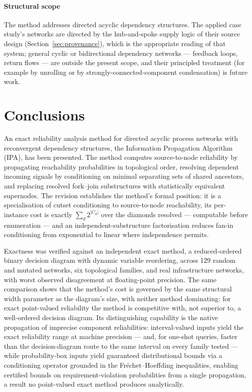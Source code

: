 \documentclass[preprint,12pt]{elsarticle}
\theoremstyle{definition}
\begin{document}
\paragraph{Structural scope} The method addresses directed acyclic dependency structures. The applied
case study's networks are directed by the hub-and-spoke supply logic of their source design
(Section~\ref{sec:provenance}), which is the appropriate reading of that system; general cyclic or
bidirectional dependency networks --- feedback loops, return flows --- are outside the present scope,
and their principled treatment (for example by unrolling or by strongly-connected-component
condensation) is future work.

\section{Conclusions}\label{sec:conclusions}

An exact reliability analysis method for directed acyclic process networks with reconvergent dependency
structures, the Information Propagation Algorithm (IPA), has been presented. The method computes
source-to-node reliability by propagating reachability probabilities in topological order, resolving
dependent incoming signals by conditioning on minimal separating sets of shared ancestors, and replacing
resolved fork--join substructures with statistically equivalent supernodes. The revision establishes the
method's formal position: it is a specialisation of cutset conditioning to source-to-node reachability,
its per-instance cost is exactly $\sum_d 2^{|C_d|}$ over the diamonds resolved --- computable before
enumeration --- and an independent-substructure factorisation reduces fan-in conditioning from
exponential to linear where independence permits.

Exactness was verified against an independent exact method, a reduced-ordered binary decision diagram
with dynamic variable reordering, across 129 random and mutated networks, six topological families, and
real infrastructure networks, with worst observed disagreement at floating-point precision. The same
comparison shows that the method's cost is governed by the same structural width parameter as the
diagram's size, with neither method dominating: for exact point-valued reliability the method is
competitive with, not superior to, a well-ordered decision diagram. Its distinguishing capability is the
native propagation of imprecise component reliabilities: interval-valued inputs yield the exact
reliability range at machine precision --- and, for one-shot queries, faster than the decision-diagram
route to the same interval on every family tested --- while probability-box inputs yield guaranteed
distributional bounds via a conditioning operator grounded in the Fr\'echet--Hoeffding inequalities,
enabling certified bounds on requirement-violation probabilities from a single propagation, a result no
point-valued exact method produces analytically.
\end{document}
